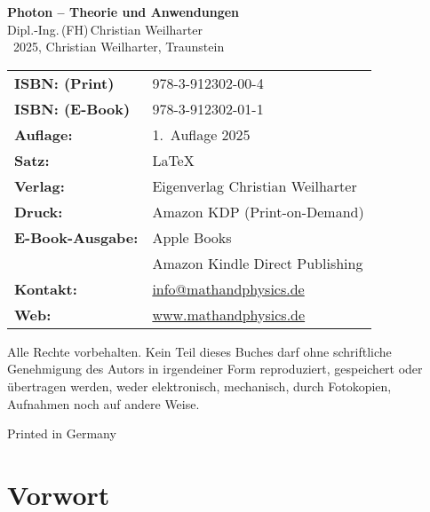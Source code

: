 \cleardoublepage
\thispagestyle{empty}
\begin{center}


{\Large\textbf{Photon – Theorie und Anwendungen}}\\[1.2em]
{\large Dipl.-Ing.\,(FH)\,Christian Weilharter}\\[1.2em]
\textcopyright~2025, Christian Weilharter, Traunstein\\[2em]
\end{center}
\begin{flushleft}
	\begin{tabular}{@{}l l}
	
	
		\textbf{ISBN: (Print)} & 978-3-912302-00-4 \\[0.5em]
			\textbf{ISBN: (E-Book)} & 978-3-912302-01-1 \\[0.5em]
		\textbf{Auflage:} & 1.~Auflage 2025 \\[0.5em]
		\textbf{Satz:} & \LaTeX \\[0.5em]
		\textbf{Verlag:} & Eigenverlag Christian Weilharter \\[0.5em]
		\textbf{Druck:} & Amazon KDP (Print-on-Demand) \\[0.5em]

			\textbf{E-Book-Ausgabe:} & Apple Books\\[0.5em]
			&Amazon Kindle Direct Publishing \\[0.5em]
		\textbf{Kontakt:} & \href{mailto:info@mathandphysics.de}{info@mathandphysics.de}\\[0.5em]
		\textbf{Web:} & \href{https://www.mathandphysics.de}{www.mathandphysics.de}\\
		

	\end{tabular}
\end{flushleft}

\vspace{2em}
\noindent
Alle Rechte vorbehalten. Kein Teil dieses Buches darf ohne schriftliche Genehmigung des Autors 
in irgendeiner Form reproduziert, gespeichert oder übertragen werden, 
weder elektronisch, mechanisch, durch Fotokopien, Aufnahmen noch auf andere Weise.
\begin{center}\small Printed in Germany\end{center}

\cleardoublepage

\chapter*{Vorwort}



